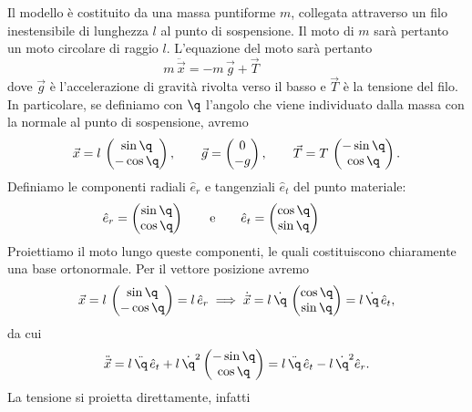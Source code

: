 Il modello è costituito da una massa puntiforme \(m\), collegata attraverso un filo inestensibile di lunghezza \(l\) al punto di sospensione.
Il moto di \(m\) sarà pertanto un moto circolare di raggio \(l\). L'equazione del moto sarà pertanto
\[
	m\,\ddot{\vec{x}} = - m\,\vec{g} + \vec{T} \qquad\qquad 
\]
dove \(\vec{g}\) è l'accelerazione di gravità rivolta verso il basso e \(\vec{T}\) è la tensione del filo. In particolare, se definiamo con \(\q\) l'angolo che viene individuato dalla massa con la normale al punto di sospensione, avremo
\[
	\vec{x} = l\,\begin{pmatrix}\sin \q\\-\cos\q\end{pmatrix}, \qquad \vec{g} = \begin{pmatrix}0\\-g\end{pmatrix}, \qquad \vec{T} = T\,\begin{pmatrix}-\sin\q\\\cos \q\end{pmatrix}.
\]
Definiamo le componenti radiali \(\hat{e}_r\) e tangenziali \(\hat{e}_t\) del punto materiale:
\[
	\hat{e}_r = \begin{pmatrix}\sin\q\\\cos\q\end{pmatrix} \qquad\text{e}\qquad \hat{e}_t = \begin{pmatrix}\cos\q\\\sin\q\end{pmatrix} \qquad \qquad 
\]
Proiettiamo il moto lungo queste componenti, le quali costituiscono chiaramente una base ortonormale. Per il vettore posizione avremo
\[
	\vec{x} = l\,	\begin{pmatrix}
		\sin\q \\
		-\cos \q	
	\end{pmatrix}
	= l\,\hat{e}_r \implies
	\dot{\vec{x}} = l\,\dot{\q}\, 	\begin{pmatrix}
		\cos\q \\
		\sin\q
	\end{pmatrix}
	= l\,\dot{\q}\,\hat{e}_t,										
\]
da cui
\[
	\ddot{\vec{x}} = l\,\ddot{\q}\,\hat{e}_t + l\,\dot{\q}^2 	\begin{pmatrix}
		-\sin\q \\
		\cos\q
	\end{pmatrix}
	= l\,\ddot{\q}\,\hat{e}_t - l\,\dot{\q}^2 \hat{e}_r.												
\]
La tensione si proietta direttamente, infatti
